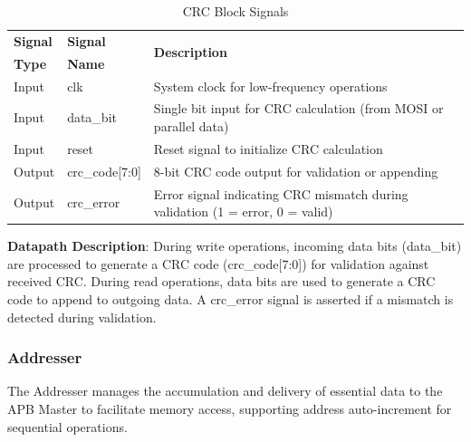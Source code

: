 \begin{table}[!htb]
    \centering
    \caption{CRC Block Signals}
    \label{tab:crc-block-signals}
    \begin{tabular}{|m{}|m{}|m{}|}
        \hline
        \textbf{Signal} & \textbf{Signal} & \multirow{2}{*}{\textbf{Description}} \\
        \textbf{Type} & \textbf{Name} & \\
        \hline
        Input & clk & System clock for low-frequency operations \\
        Input & data\_bit & Single bit input for CRC calculation (from MOSI or parallel data) \\
        Input & reset & Reset signal to initialize CRC calculation \\
        Output & crc\_code[7:0] & 8-bit CRC code output for validation or appending \\
        Output & crc\_error & Error signal indicating CRC mismatch during validation (1 = error, 0 = valid) \\
        \hline
    \end{tabular}
\end{table}

\textbf{Datapath Description}: During write operations, incoming data bits (data\_bit) are processed to generate a CRC code (crc\_code[7:0]) for validation against received CRC. During read operations, data bits are used to generate a CRC code to append to outgoing data. A crc\_error signal is asserted if a mismatch is detected during validation.

\subsubsection{Addresser}
The Addresser manages the accumulation and delivery of essential data to the APB Master to facilitate memory access, supporting address auto-increment for sequential operations.

